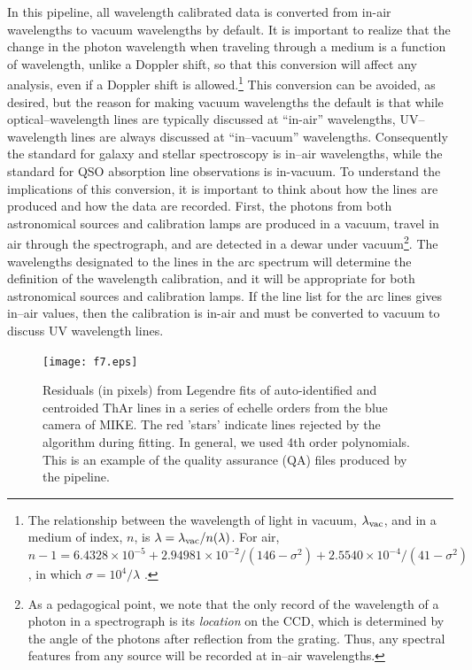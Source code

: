 \documentclass[]{emulateapj}
\begin{document}
In this pipeline, all wavelength calibrated data is converted from
in-air wavelengths to vacuum wavelengths by default.  It is important
to realize that the change in the photon wavelength when traveling
through a medium is a function of wavelength, unlike a Doppler shift,
so that this conversion will affect any analysis, even if a Doppler
shift is allowed.\footnote{The relationship between the wavelength of
  light in vacuum, $\lambda_{\rm vac}$, and in a medium of index, $n$,
  is $\lambda = \lambda_{\rm vac}/n(\lambda)$.  For air, $n-1 =
  6.4328\times 10^{-5} + 2.94981\times 10^{-2}/(146-\sigma^2) +
  2.5540\times 10^{-4}/(41-\sigma^2)$, 
  in which $\sigma=10^4/\lambda$ \citep{ciddor96}.}
This conversion can be avoided, as desired, 
but the reason for making vacuum
wavelengths the default is that while optical--wavelength lines are
typically discussed at ``in-air'' wavelengths, UV--wavelength lines
are always discussed at ``in--vacuum'' wavelengths. 
Consequently the
standard for galaxy and stellar spectroscopy is in--air wavelengths,
while the standard for QSO absorption line observations is in-vacuum.
To understand the implications of this conversion, it is important to
think about how the lines are produced and how the data are
recorded.  First, the photons from both astronomical sources and
calibration lamps are produced in a vacuum, travel in air through the
spectrograph, and are detected in a dewar under vacuum\footnote{As a
  pedagogical point, we note that the only record of the wavelength of
  a photon in a spectrograph is its {\it location} on the CCD, which
  is determined by the angle of the photons after reflection from the
  grating.  Thus, any spectral features from any source will be
  recorded at in--air wavelengths.}.  The wavelengths designated to the
lines in the arc spectrum will determine the definition of the
wavelength calibration, and it will be appropriate for both
astronomical sources and calibration lamps.  If the line list for the
arc lines gives in--air values, then the calibration is in-air and
must be converted to vacuum to discuss UV wavelength lines.  

\begin{figure}
\texttt{[image: f7.eps]}
\caption{Residuals (in pixels) from Legendre fits of auto-identified
and centroided ThAr lines in a series of echelle orders from the
blue camera of MIKE.  The red 'stars' indicate lines rejected by
the algorithm during fitting.  In general, we used 4th order
polynomials.  This is an example of the quality assurance (QA) 
files produced by the pipeline.
}
\label{fig:wav1D}
\end{figure}
\end{document}
